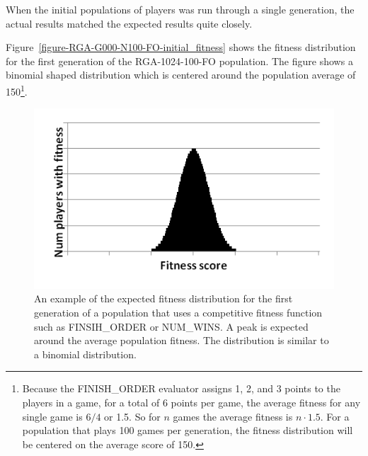 When the initial populations of players was run through a single generation, the
actual results matched the expected results quite closely.

Figure~\ref{figure-RGA-G000-N100-FO-initial_fitness} shows the fitness
distribution for the first generation of the RGA-1024-100-FO population. The
figure shows a binomial shaped distribution which is centered around the
population average of 150\footnote{Because the FINISH\_ORDER evaluator assigns
1, 2, and 3 points to the players in a game, for a total of 6 points per game,
the average fitness for any single game is \(6/4\) or 1.5. So for \(n\) games
the average fitness is \(n \cdot 1.5\). For a population that plays 100 games
per generation, the fitness distribution will be centered on the average score
of 150.}.

\begin{figure}
\centering
\begin{minipage}[t]{0.47\linewidth}
\centering
\includegraphics[width=1.0\linewidth]{Figures/binomial.png}
\caption[Binomial Distribution]{An example of the expected fitness distribution
for the first generation of a population that uses a competitive fitness
function such as FINSIH\_ORDER or NUM\_WINS. A peak is expected around the
average population fitness. The distribution is similar to a binomial
distribution.}
\label{figure-binomial}
\end{minipage}%
\hspace{0.06\linewidth}%
\begin{minipage}[t]{0.47\linewidth}
\centering

\end{minipage}
\end{figure}
